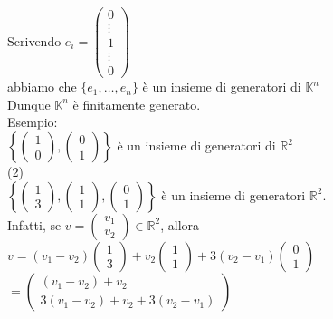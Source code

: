 \documentclass[12pt]{article}
\begin{document}
\begin{center}
    Scrivendo $e_i = \begin{pmatrix}
        0\\
        \vdots\\
        1\\
        \vdots\\
        0
    \end{pmatrix}$\\
    abbiamo che $\{e_1, \dots, e_n\}$ è un insieme di generatori di $\mathbb{K}^n$\\
    Dunque $\mathbb{K}^n$ è finitamente generato.\\
    Esempio:\\
    $\left\{  \begin{pmatrix}
        1\\
        0
    \end{pmatrix}, \begin{pmatrix}
        0\\
        1
    \end{pmatrix}\right\}$ è un insieme di generatori di $\mathbb{R}^2$\\
    (2)\\
    $\left\{ \begin{pmatrix}
        1\\
        3
    \end{pmatrix}, \begin{pmatrix}
        1\\
        1
    \end{pmatrix}, \begin{pmatrix}
        0\\
        1
    \end{pmatrix} \right\}$ è un insieme di generatori $\mathbb{R}^2$.\\
    Infatti, se $v = \begin{pmatrix}
        v_1\\
        v_2
    \end{pmatrix} \in \mathbb{R}^2$, allora\\
    $v = (v_1 - v_2) \begin{pmatrix}
        1\\
        3
    \end{pmatrix} + v_2 \begin{pmatrix}
        1\\
        1
    \end{pmatrix} + 3(v_2 - v_1) \begin{pmatrix}
        0\\1
    \end{pmatrix}$\\
    $= \begin{pmatrix}
        (v_1 - v_2) + v_2\\
        3(v_1 - v_2) + v_2 + 3(v_2 - v_1)
    \end{pmatrix}$
\end{center}
\end{document}
